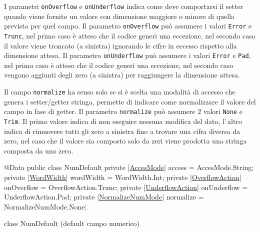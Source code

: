 \documentclass[a4paper,10pt]{report}
\newif\ifesource
\newenvironment{elisting}[1][H]
  {\captionsetup{aboveskip=0pt}\begin{listing}[#1]}
  {\end{listing}%
}
\begin{document}
I parametri \verb!onOverflow! e \verb!onUnderflow! indica come deve comportarsi
il setter quando viene fornito un valore con dimensione maggiore o minore di
quella prevista per quel campo.
Il parametro \verb!onOverflow! può assumere i valori \verb!Error! e 
\verb!Trunc!, nel primo caso è atteso che il codice generi una eccezione,
nel secondo caso il valore viene troncato (a sinistra) ignorando le cifre in
eccesso rispetto alla dimensione attesa.
Il parametro \verb!onUnderflow! può assumere i valori \verb!Error! e \verb!Pad!,
nel primo caso è atteso che il codice generi una eccezione, nel secondo caso
vengono aggiunti degli zero (a sinistra) per raggiungere la dimensione attesa.

Il campo \verb!normalize! ha senso solo se si è scelta una modalità di
accesso che genera i setter/getter stringa, permette di indicare come 
normalizzare il valore del campo in fase di getter.
Il parametro \verb!normalize! può assumere 2 valori \verb!None! e \verb!Trim!. 
Il primo valore indica di non eseguire nessuna modifica del dato,
l'\,altro indica di rimuovere tutti gli zero a sinistra fino a trovare
una cifra diversa da zero, nel caso che il valore sia composto solo da
zeri viene prodotta una stringa composta da uno zero.

\ifesource
\begin{figure*}[!htb]
\begin{lstlisting}[language=java, 
caption=class NumDefault (default campo numerico), 
label=lst:NumDefault]
@Data
public class NumDefault {
    private (*\hyperref[lst:AccesMode]{AccesMode}*) access = AccesMode.String;
    private (*\hyperref[lst:WordWidth]{WordWidth}*) wordWidth = WordWidth.Int;
    private (*\hyperref[lst:OverflowAction]{OverflowAction}*) onOverflow = OverflowAction.Trunc;
    private (*\hyperref[lst:UnderflowAction]{UnderflowAction}*) onUnderflow = UnderflowAction.Pad;
    private (*\hyperref[lst:NormalizeNumMode]{NormalizeNumMode}*) normalize = NormalizeNumMode.None;
}
\end{lstlisting}\index{NumDefault}
\end{figure*}
\else
\begin{elisting}[!htb]
\begin{javacode}
@Data
public class NumDefault {
    private |\hyperref[lst:AccesMode]{AccesMode}| access = AccesMode.String;
    private |\hyperref[lst:WordWidth]{WordWidth}| wordWidth = WordWidth.Int;
    private |\hyperref[lst:OverflowAction]{OverflowAction}| onOverflow = OverflowAction.Trunc;
    private |\hyperref[lst:UnderflowAction]{UnderflowAction}| onUnderflow = UnderflowAction.Pad;
    private |\hyperref[lst:NormalizeNumMode]{NormalizeNumMode}| normalize = NormalizeNumMode.None;
}
\end{javacode}
\caption{class NumDefault (default campo numerico)}
\label{lst:NumDefault}
\end{elisting}
\fi
\end{document}
